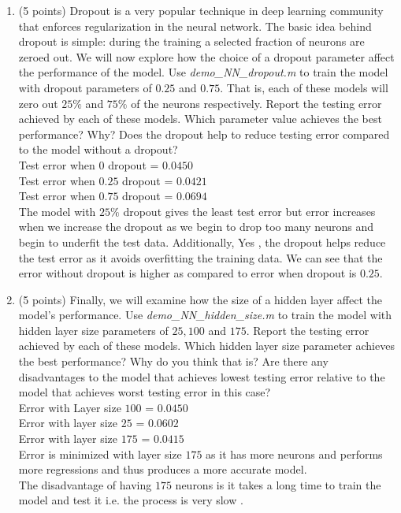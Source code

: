 \documentclass[english]{article}
\begin{document}
\begin{enumerate}
\item (5 points) Dropout is a very popular technique in deep learning community that enforces regularization in the neural network. The basic idea behind dropout is simple: during the training a selected fraction of neurons are zeroed out. We will now explore how the choice of a dropout parameter affect the performance of the model. Use \textit{demo\_NN\_dropout.m} to train the model with dropout parameters of $0.25$ and $0.75$. That is, each of these models will zero out $25\%$ and $75\%$ of the neurons respectively. Report the testing error achieved by each of these models. Which parameter value achieves the best performance? Why? Does the dropout help to reduce testing error compared to the model without a dropout? \\
Test error when $0$ dropout = $0.0450$\\
Test error when $0.25$ dropout = $0.0421$\\
Test error when $0.75$ dropout = $0.0694$\\
The model with $25\%$ dropout gives the least test error but error increases when we increase the dropout as we begin to drop too many neurons and begin to underfit the test data. Additionally, Yes , the dropout helps reduce the test error as it avoids overfitting the training data. We can see that the error without dropout is higher as compared to error when dropout is $0.25$. \\

\item (5 points) Finally, we will examine how the size of a hidden layer affect the model's performance. Use \textit{demo\_NN\_hidden\_size.m} to train the model with hidden layer size parameters of $25, 100$ and $175$. Report the testing error achieved by each of these models. Which hidden layer size parameter achieves the best performance? Why do you think that is? Are there any disadvantages to the model that achieves lowest testing error relative to the model that achieves worst testing error in this case?\\
Error with Layer size $100$ = $0.0450$ \\
Error with layer size $25$ = $0.0602$ \\
Error with layer size $175$ = $0.0415$ \\
Error is minimized with layer size $175$ as it has more neurons and performs more regressions and thus produces a more accurate model. \\
The disadvantage of having $175$ neurons is it takes a long time to train the model and test it i.e. the process is very slow .\\

\end{enumerate}
\end{document}
